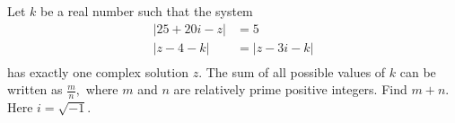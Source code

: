 Let $k$ be a real number such that the system
\begin{align*} |25+20i-z|&=5\\ |z-4-k|&=|z-3i-k| \\ \end{align*}
has exactly one complex solution $z$. The sum of all possible values of $k$ can be written as $\frac{m}{n},$ where $m$ and $n$ are relatively prime positive integers. Find $m+n.$ Here $i=\sqrt{-1}.$